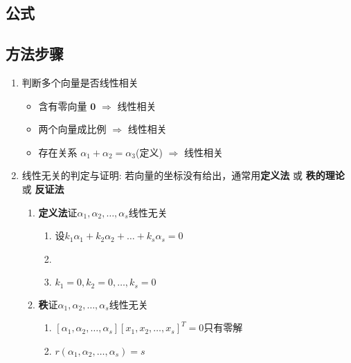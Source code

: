 \documentclass[a4paper,12pt]{article}
\begin{document}
    \subsection{公式}

    \begin{enumerate}

    \end{enumerate}

    \subsection{方法步骤}

    \begin{enumerate}
        \item 判断多个向量是否线性相关
        \begin{itemize}
            \item 含有零向量 $\mathbf{0}$ $\Rightarrow$ 线性相关
            \item 两个向量成比例 $\Rightarrow$ 线性相关
            \item 存在关系 $\alpha_1 + \alpha_2 = \alpha_3$(定义) $\Rightarrow$ 线性相关
        \end{itemize}
        \item 线性无关的判定与证明:\; 若向量的坐标没有给出，通常用\textbf{定义法} 或 \textbf{秩的理论} 或 \textbf{反证法}
        \begin{enumerate}
            \item \textbf{定义法}证$\alpha_1, \alpha_2, \dots, \alpha_s$线性无关
            \begin{enumerate}
                \item 设$k_{1}\alpha_1 + k_{2}\alpha_2 + \dots + k_{s}\alpha_s = 0$
                \item \Downarrow {}
                \item $k_1 = 0, k_2 = 0, \dots, k_s = 0$
            \end{enumerate}
            \item \textbf{秩}证$\alpha_1, \alpha_2, \dots, \alpha_s$线性无关
            \begin{enumerate}
                \item \Leftrightarrow $[\alpha_1, \alpha_2, \dots, \alpha_s][x_1, x_2, \dots, x_s]^T = 0$只有零解
                \item \Leftrightarrow {}$r(\alpha_1, \alpha_2, \dots, \alpha_s) = s$
                \begin{itemize}

\end{itemize}
\end{enumerate}
\end{enumerate}
\end{enumerate}
\end{document}
